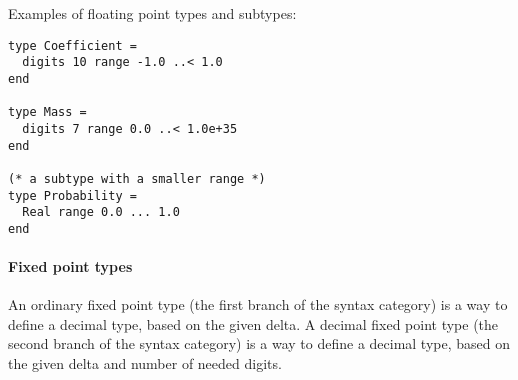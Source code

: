 \example Examples of floating point types and subtypes:
\begin{lstlisting}
type Coefficient = 
  digits 10 range -1.0 ..< 1.0 
end

type Mass =
  digits 7 range 0.0 ..< 1.0e+35 
end

(* a subtype with a smaller range *)
type Probability = 
  Real range 0.0 ... 1.0
end 
\end{lstlisting}

\paragraph{Fixed point types}
An ordinary fixed point type (the first branch of the  syntax category) is a way to define a decimal type, based on the given delta. 
A decimal fixed point type (the second branch of the  syntax category) is a way to define a decimal type, based on the given delta and number of needed digits.  
